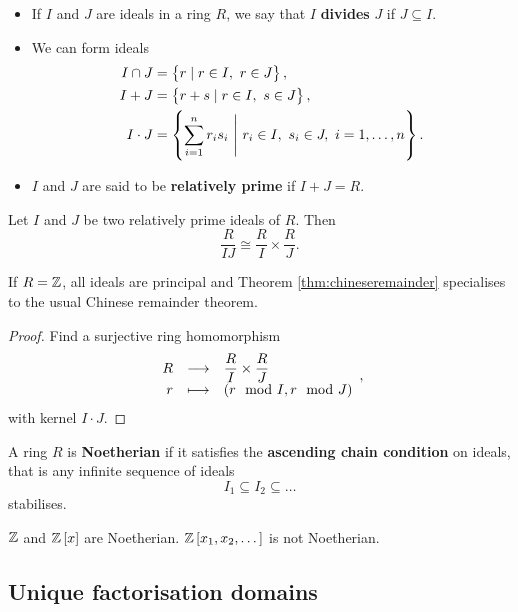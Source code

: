 \begin{definition}
\hfill
\begin{itemize}
\item If $ I $ and $ J $ are ideals in a ring $ R $, we say that $ I $ \textbf{divides} $ J $ if $ J \subseteq I $.
\item We can form ideals
\begin{align*}
I \cap J & = \cbr{r \mid r \in I, \ r \in J}, \\
I + J & = \cbr{r + s \mid r \in I, \ s \in J}, \\
I \cdot J & = \cbr{\sum_{i = 1}^n r_is_i \ \Bigg| \ r_i \in I, \ s_i \in J, \ i = 1, \dots, n}.
\end{align*}
\item $ I $ and $ J $ are said to be \textbf{relatively prime} if $ I + J = R $.
\end{itemize}
\end{definition}

\begin{theorem}
\label{thm:chineseremainder}
Let $ I $ and $ J $ be two relatively prime ideals of $ R $. Then
$$ \dfrac{R}{IJ} \cong \dfrac{R}{I} \times \dfrac{R}{J}. $$
\end{theorem}

\begin{remark*}
If $ R = \mathbb{Z} $, all ideals are principal and Theorem \ref{thm:chineseremainder} specialises to the usual Chinese remainder theorem.
\end{remark*}

\begin{proof}
Find a surjective ring homomorphism
$$ \function{R}{\dfrac{R}{I} \times \dfrac{R}{J}}{r}{\br{r \mod I, r \mod J}}, $$
with kernel $ I \cdot J $.
\end{proof}

\begin{definition}
A ring $ R $ is \textbf{Noetherian} if it satisfies the \textbf{ascending chain condition} on ideals, that is any infinite sequence of ideals
$$ I_1 \subseteq I_2 \subseteq \dots $$
stabilises.
\end{definition}

\begin{example*}
$ \mathbb{Z} $ and $ \Z\sbr{x} $ are Noetherian. $ \Z\sbr{x_1, x_2, \dots} $ is not Noetherian.
\end{example*}

\pagebreak

\subsection{Unique factorisation domains}

